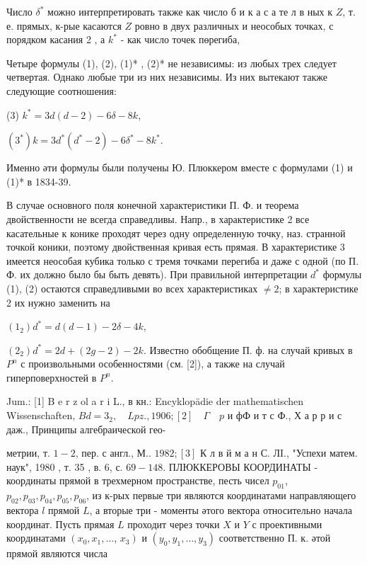 \documentclass[10pt]{article}
\begin{document}
Число $\delta^{*}$ можно интерпретировать также как число б и к а с а те л в ных к $Z$, т. е. прямых, к-рые касаются $Z$ ровно в двух различных и неособых точках, с порядком касания 2 , а $k^{*}$ - как число точек пөрегиба,



Четыре формулы (1), (2), (1)* , (2)* не независимы: из любых трех следует четвертая. Однако любые три из них независимы. Из них вытекают также следующие соотношения:



(3) $k^{*}=3 d(d-2)-6 \delta-8 k$,



$\left(3^{*}\right) k=3 d^{*}\left(d^{*}-2\right)-6 \delta^{*}-8 k^{*}$.



Именно әти формулы были получены Ю. Плюккером вместе с формулами (1) и (1)* в 1834-39.



В случае основного поля конечной характеристики П. Ф. и теорема двойственности не всегда справедливы. Напр., в характеристике 2 все касательные к конике проходят через одну определенную точку, наз. странной точкой коники, поэтому двойственная кривая есть прямая. В характеристике 3 имеется неособая кубика только с тремя точками перегиба и даже с одной (по П. Ф. их должно было бы быть девять). При правильной интерпретации $d^{*}$ формулы (1), (2) остаются справедливыми во всех характеристиках $\neq 2$; в характеристике 2 их нужно заменить на



$\left(1_{2}\right) d^{*}=d(d-1)-2 \delta-4 k$,



$\left(2_{2}\right) d^{*}=2 d+(2 g-2)-2 k$. Известно обобщение П. ф. на случай кривых в $P^{n}$ с произвольными особенностями (см. [2]), а также на случай гиперповерхностей в $P^{n}$.



Jum.: [1] B e r z ol a r i L., в кн.: Encyklopädie der mathematischen Wissenschaften, $B d=3_{2}, \quad L p z ., 1906 ;[2] \quad \Gamma \quad p$ и фФ и т с Ф., Х а р р и с даж., Принципы алгебраической гео-

метрии, т. $1-2$, пер. с англ., М.. $1982 ;[3]$ К л в й м а н С. ЛI., "Успехи матем. наук", 1980 , т. 35 , в. 6, с. $69-148$. ПЛЮККЕРОВЫ КООРДИНАТЫ - координаты прямой в трехмерном пространстве, песть чисел $p_{01}$, $p_{02}, p_{03}, p_{04}, p_{05}, p_{06}$, из к-рых первые три являются координатами направляющего вектора $l$ прямой $L$, а вторые три - моменты әтого вектора относительно начала координат. Пусть прямая $L$ проходит через точки $X$ и $Y$ с проективными координатами $\left(x_{0}, x_{1}, \ldots\right.$, $\left.x_{3}\right)$ и $\left(y_{0}, y_{1}, \ldots, y_{3}\right)$ соответственно П. к. әтой прямой являются числа
\end{document}
